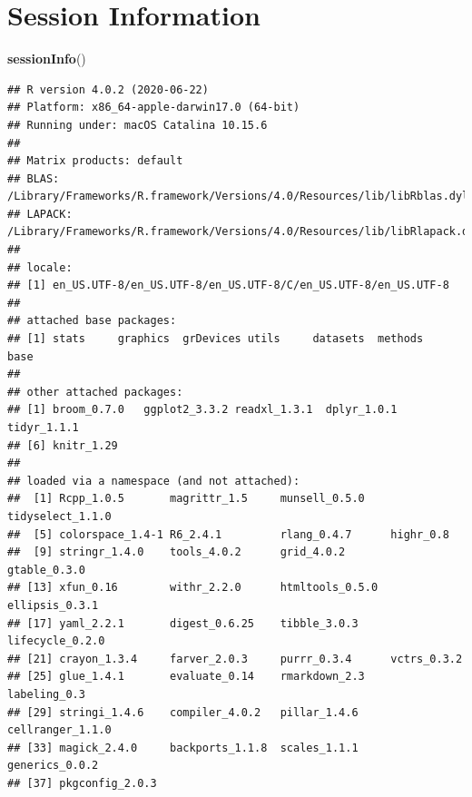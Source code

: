 \documentclass[]{article}
\newenvironment{Shaded}{\begin{snugshade}}{\end{snugshade}}
\newcommand{\KeywordTok}[1]{\textcolor[rgb]{0.13,0.29,0.53}{\textbf{#1}}}
\newcommand{\NormalTok}[1]{#1}
\begin{document}
\hypertarget{session-information}{%
\section{Session Information}\label{session-information}}

\begin{Shaded}
\begin{Highlighting}[]
\KeywordTok{sessionInfo}\NormalTok{()}
\end{Highlighting}
\end{Shaded}

\begin{verbatim}
## R version 4.0.2 (2020-06-22)
## Platform: x86_64-apple-darwin17.0 (64-bit)
## Running under: macOS Catalina 10.15.6
## 
## Matrix products: default
## BLAS:   /Library/Frameworks/R.framework/Versions/4.0/Resources/lib/libRblas.dylib
## LAPACK: /Library/Frameworks/R.framework/Versions/4.0/Resources/lib/libRlapack.dylib
## 
## locale:
## [1] en_US.UTF-8/en_US.UTF-8/en_US.UTF-8/C/en_US.UTF-8/en_US.UTF-8
## 
## attached base packages:
## [1] stats     graphics  grDevices utils     datasets  methods   base     
## 
## other attached packages:
## [1] broom_0.7.0   ggplot2_3.3.2 readxl_1.3.1  dplyr_1.0.1   tidyr_1.1.1  
## [6] knitr_1.29   
## 
## loaded via a namespace (and not attached):
##  [1] Rcpp_1.0.5       magrittr_1.5     munsell_0.5.0    tidyselect_1.1.0
##  [5] colorspace_1.4-1 R6_2.4.1         rlang_0.4.7      highr_0.8       
##  [9] stringr_1.4.0    tools_4.0.2      grid_4.0.2       gtable_0.3.0    
## [13] xfun_0.16        withr_2.2.0      htmltools_0.5.0  ellipsis_0.3.1  
## [17] yaml_2.2.1       digest_0.6.25    tibble_3.0.3     lifecycle_0.2.0 
## [21] crayon_1.3.4     farver_2.0.3     purrr_0.3.4      vctrs_0.3.2     
## [25] glue_1.4.1       evaluate_0.14    rmarkdown_2.3    labeling_0.3    
## [29] stringi_1.4.6    compiler_4.0.2   pillar_1.4.6     cellranger_1.1.0
## [33] magick_2.4.0     backports_1.1.8  scales_1.1.1     generics_0.0.2  
## [37] pkgconfig_2.0.3
\end{verbatim}
\end{document}
